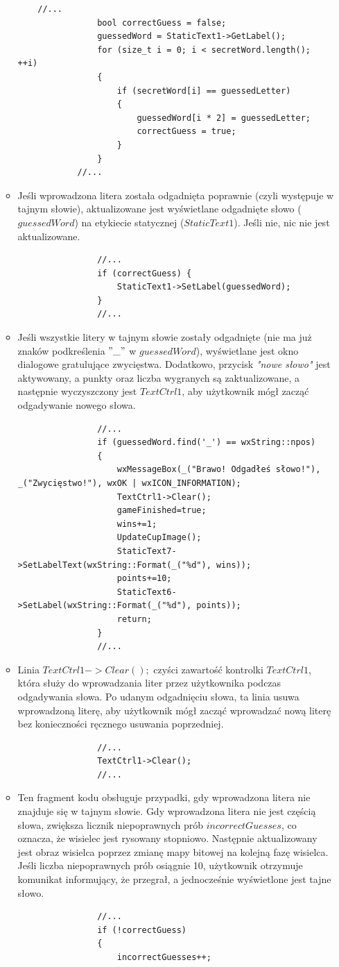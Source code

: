 \documentclass[]{report}
\begin{document}
\begin{itemize}
\begin{itemize}
			\begin{lstlisting}
	//...
				bool correctGuess = false;
				guessedWord = StaticText1->GetLabel();
				for (size_t i = 0; i < secretWord.length(); ++i)
				{
					if (secretWord[i] == guessedLetter)
					{
						guessedWord[i * 2] = guessedLetter;
						correctGuess = true;
					}
				}
			//...
			\end{lstlisting}
			\item Jeśli wprowadzona litera została odgadnięta poprawnie (czyli występuje w tajnym słowie), aktualizowane jest wyświetlane odgadnięte słowo ($guessedWord$) na etykiecie statycznej ($StaticText1$). Jeśli nie, nic nie jest aktualizowane.
			\begin{lstlisting}
				//...
				if (correctGuess) {
					StaticText1->SetLabel(guessedWord);
				}
				//...
			\end{lstlisting}
	\newpage
			\item Jeśli wszystkie litery w tajnym słowie zostały odgadnięte (nie ma już znaków podkreślenia $"\_"$ w $guessedWord$), wyświetlane jest okno dialogowe gratulujące zwycięstwa. Dodatkowo, przycisk \textit{"nowe słowo"} jest aktywowany, a punkty oraz liczba wygranych są zaktualizowane, a następnie wyczyszczony jest $TextCtrl1$, aby użytkownik mógł zacząć odgadywanie nowego słowa.
			\begin{lstlisting}
				//...
				if (guessedWord.find('_') == wxString::npos)
				{
					wxMessageBox(_("Brawo! Odgadłeś słowo!"), _("Zwycięstwo!"), wxOK | wxICON_INFORMATION);
					TextCtrl1->Clear();
					gameFinished=true;
					wins+=1;
					UpdateCupImage();
					StaticText7->SetLabelText(wxString::Format(_("%d"), wins));
					points+=10;
					StaticText6->SetLabel(wxString::Format(_("%d"), points));
					return;
				}
				//...
			\end{lstlisting}
			\item Linia $TextCtrl1->Clear();$ czyści zawartość kontrolki $TextCtrl1$, która służy do wprowadzania liter przez użytkownika podczas odgadywania słowa. Po udanym odgadnięciu słowa, ta linia usuwa wprowadzoną literę, aby użytkownik mógł zacząć wprowadzać nową literę bez konieczności ręcznego usuwania poprzedniej.
			\begin{lstlisting}
				//...
				TextCtrl1->Clear();
				//...
			\end{lstlisting}
			\item Ten fragment kodu obsługuje przypadki, gdy wprowadzona litera nie znajduje się w tajnym słowie. Gdy wprowadzona litera nie jest częścią słowa, zwiększa licznik niepoprawnych prób $incorrectGuesses$, co oznacza, że wisielec jest rysowany stopniowo. Następnie aktualizowany jest obraz wisielca poprzez zmianę mapy bitowej na kolejną fazę wisielca. Jeśli liczba niepoprawnych prób osiągnie 10, użytkownik otrzymuje komunikat informujący, że przegrał, a jednocześnie wyświetlone jest tajne słowo.
			\begin{lstlisting}
				//...
				if (!correctGuess)
				{
					incorrectGuesses++;
					

\end{lstlisting}
\end{itemize}
\end{itemize}
\end{document}
